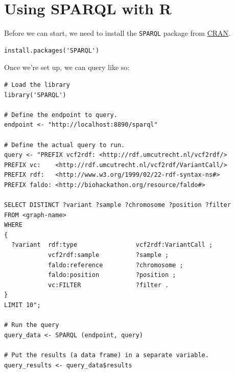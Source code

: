 \documentclass[11pt,a4paper,oneside]{book}
\begin{document}
\section{Using SPARQL with R}
\label{sec:sparql-with-r}

  Before we can start, we need to install the \texttt{SPARQL} package from
  \href{https://cran.r-project.org/web/packages/SPARQL/index.html}{CRAN}.

\begin{siderules}
\begin{verbatim}
install.packages('SPARQL')
\end{verbatim}
\end{siderules}

  Once we're set up, we can query like so:

\begin{siderules}
\begin{verbatim}
# Load the library
library('SPARQL')

# Define the endpoint to query.
endpoint <- "http://localhost:8890/sparql"

# Define the actual query to run.
query <- "PREFIX vcf2rdf: <http://rdf.umcutrecht.nl/vcf2rdf/>
PREFIX vc:    <http://rdf.umcutrecht.nl/vcf2rdf/VariantCall/>
PREFIX rdf:   <http://www.w3.org/1999/02/22-rdf-syntax-ns#>
PREFIX faldo: <http://biohackathon.org/resource/faldo#>

SELECT DISTINCT ?variant ?sample ?chromosome ?position ?filter
FROM <graph-name>
WHERE
{
  ?variant  rdf:type                vcf2rdf:VariantCall ;
            vcf2rdf:sample          ?sample ;
            faldo:reference         ?chromosome ;
            faldo:position          ?position ;
            vc:FILTER               ?filter .
}
LIMIT 10";

# Run the query
query_data <- SPARQL (endpoint, query)

# Put the results (a data frame) in a separate variable.
query_results <- query_data$results
\end{verbatim}
\end{siderules}
\end{document}
